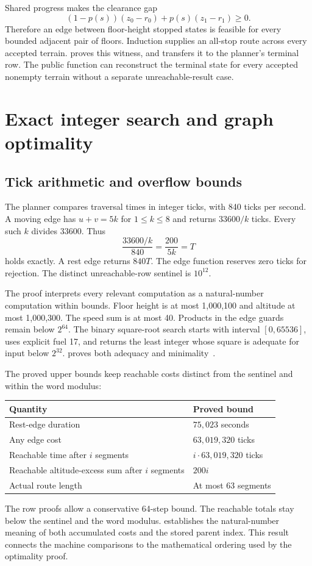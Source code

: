 \documentclass[11pt]{article}
\begin{document}
Shared progress makes the clearance gap
\[
 (1-p(s))(z_0-r_0)+p(s)(z_1-r_1)\geq0.
\]
Therefore an edge between floor-height stopped states is feasible for every bounded adjacent pair of floors.  Induction supplies an all-stop route across every accepted terrain.   proves this witness, and  transfers it to the planner's terminal row.  The public function can reconstruct the terminal state for every accepted nonempty terrain without a separate unreachable-result case.

\section{Exact integer search and graph optimality}
\label{sec:search}

\subsection{Tick arithmetic and overflow bounds}

The planner compares traversal times in integer ticks, with 840 ticks per second.  A moving edge has $u+v=5k$ for $1\leq k\leq8$ and returns $33600/k$ ticks.  Every such $k$ divides 33600.  Thus
\[
 \frac{33600/k}{840}=\frac{200}{5k}=T
\]
holds exactly.  A rest edge returns $840T$.  The edge function reserves zero ticks for rejection.  The distinct unreachable-row sentinel is $10^{12}$.

The proof interprets every relevant  computation as a natural-number computation within bounds.  Floor height is at most 1,000,100 and altitude at most 1,000,300.  The speed sum is at most 40.  Products in the edge guards remain below $2^{64}$.  The binary square-root search starts with interval $[0,65536]$, uses explicit fuel 17, and returns the least integer whose square is adequate for input below $2^{32}$.   proves both adequacy and minimality~\cite{drone-proofs}.

The proved upper bounds keep reachable costs distinct from the sentinel and within the word modulus:
\begin{center}
\begin{tabular}{ll}
\toprule
Quantity & Proved bound\\
\midrule
Rest-edge duration & $75{,}023$ seconds\\
Any edge cost & $63{,}019{,}320$ ticks\\
Reachable time after $i$ segments & $i\cdot63{,}019{,}320$ ticks\\
Reachable altitude-excess sum after $i$ segments & $200i$\\
Actual route length & At most 63 segments\\
\bottomrule
\end{tabular}
\end{center}
The row proofs allow a conservative 64-step bound.  The reachable totals stay below the sentinel and the word modulus.   establishes the natural-number meaning of both accumulated costs and the stored parent index.  This result connects the machine comparisons to the mathematical ordering used by the optimality proof.
\end{document}
